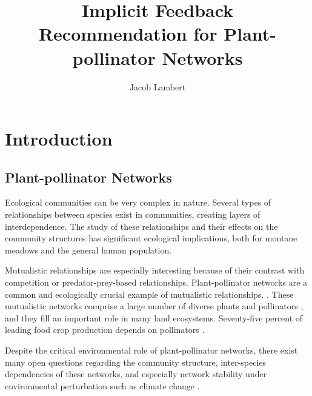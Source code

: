 \documentclass[twocolumn]{article}
\title{Implicit Feedback Recommendation for Plant-pollinator Networks}
\author{Jacob Lambert}
\affil{Department of Computer Science, Mathematics, University of Tennessee}
\date{}
\begin{document}
\maketitle


\section{Introduction}

\subsection{Plant-pollinator Networks}
Ecological communities can be very complex in nature. Several
types of relationships between species exist in communities, creating
layers of interdependence. The study of these relationships and their
effects on the community structures has significant ecological implications, both for montane meadows and the general human population\cite{bronstein2006evolution}.

Mutualistic relationships are especially interesting because of their
contrast with competition or predator-prey-based relationships.
Plant-pollinator networks are a
common and ecologically crucial example of mutualistic relationships.
\cite{ollerton2011many}. These mutualistic networks comprise a large
number of diverse plants and pollinators \cite{bascompte2007plant},
and they fill an important role in many land ecosystems.
Seventy-five percent of leading food crop production depends on
pollinators \cite{klein2007importance}.

Despite the critical environmental role of plant-pollinator networks,
there exist many open questions regarding the community structure,
inter-species dependencies of these networks, and especially network stability under environmental
perturbation such as climate change \cite{hegland2009does}.
\end{document}
